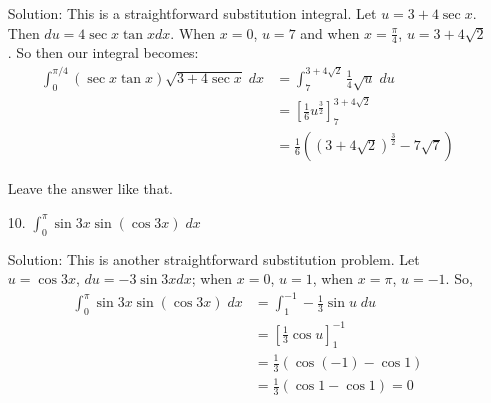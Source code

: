 \documentclass[11pt,reqno]{article}
\theoremstyle{definition}
\begin{document}
\begin{enumerate}
	Solution: This is a straightforward substitution integral. Let $u = 3 + 4 \sec x$. Then $du =  4 \sec x \tan x dx$. When $x = 0$, $u = 7$ and when $x = \frac{\pi}{4}$, $u = 3 + 4\sqrt{2}$. So then our integral becomes:
	\begin{align*}
		\int_{0}^{\pi/4} (\sec x \tan x) \sqrt{3 + 4 \sec x} \;dx &= \int_{7}^{3 + 4\sqrt{2}} \frac{1}{4}\sqrt{u} \; du \\
																  &= \left[\frac{1}{6}u^{\frac{3}{2}}\right]_{7}^{3 + 4\sqrt{2}} \\
																 &= \frac{1}{6}\left((3 + 4\sqrt{2})^{\frac{3}{2}} - 7 \sqrt{7}\right)								
																 															 \end{align*}
	
	Leave the answer like that.
	
	\item[10.] $\int_{0}^{\pi} \sin 3x \sin(\cos 3x) \; dx$
	
	Solution: This is another straightforward substitution problem. Let $u = \cos 3x$, $du = - 3 \sin 3x dx$; when $x = 0$, $u = 1$, when $x = \pi$, $u = -1$. So,
	\begin{align*}
		\int_{0}^{\pi} \sin 3x \sin(\cos 3x) \; dx &= \int_{1}^{-1} -\frac{1}{3} \sin u \; du \\
												   &= \left[\frac{1}{3} \cos u\right]_{1}^{-1} \\
												   &= \frac{1}{3} (\cos (-1) - \cos 1) \\
												   &= \frac{1}{3} (\cos 1 - \cos 1) = 0
	\end{align*}
	
	
\end{enumerate}

	
	
	
	
\end{document}

